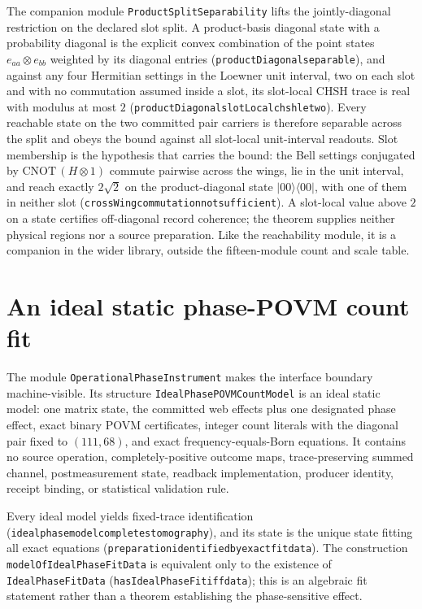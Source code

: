 \documentclass[11pt]{article}
\renewcommand{\_}{\textunderscore\allowbreak}
\theoremstyle{remark}
\begin{document}
The companion module \texttt{ProductSplitSeparability} lifts the jointly-diagonal
restriction on the declared slot split. A product-basis diagonal state with a probability
diagonal is the explicit convex combination of the point states $e_{aa}\otimes e_{bb}$
weighted by its diagonal entries (\texttt{productDiagonal\_separable}), and against any
four Hermitian settings in the Loewner unit interval, two on each slot and with no
commutation assumed inside a slot, its slot-local CHSH trace is real with modulus at most
$2$ (\texttt{productDiagonal\_slotLocal\_chsh\_le\_two}). Every reachable state on the
two committed pair carriers is therefore separable across the split and obeys the bound
against all slot-local unit-interval readouts. Slot membership is the hypothesis that carries
the bound: the Bell
settings conjugated by $\mathrm{CNOT}\,(H\otimes1)$ commute pairwise across the wings, lie
in the unit interval, and reach exactly $2\sqrt2$ on the product-diagonal state
$|00\rangle\langle00|$, with one of them in neither slot
(\texttt{crossWing\_commutation\_not\_sufficient}). A slot-local value above $2$ on a state certifies
off-diagonal record coherence; the theorem supplies neither physical regions nor a source preparation.
Like the reachability module, it is a companion in the wider library, outside the
fifteen-module count and scale table.

\section{An ideal static phase-POVM count fit}
\label{sec:phase-instrument}

The module \texttt{OperationalPhaseInstrument} makes the interface
boundary machine-visible. Its structure
\texttt{IdealPhasePOVMCountModel} is an ideal static model: one matrix state,
the committed web effects plus one designated phase effect, exact binary POVM
certificates, integer count literals with the diagonal pair fixed to
$(111,68)$, and exact frequency-equals-Born equations. It contains no source
operation, completely-positive outcome maps, trace-preserving summed channel,
postmeasurement state, readback implementation, producer identity, receipt
binding, or statistical validation rule.

Every ideal model yields fixed-trace identification
(\texttt{ideal\_phase\_model\_completes\_tomography}), and its state is the
unique state fitting all exact equations
(\texttt{preparation\_identified\_by\_exact\_fit\_data}). The construction
\texttt{modelOfIdealPhaseFitData} is equivalent only to the existence of
\texttt{IdealPhaseFitData} (\texttt{hasIdealPhaseFit\_iff\_data}); this is an
algebraic fit statement rather than a theorem establishing the
phase-sensitive effect.
\end{document}
